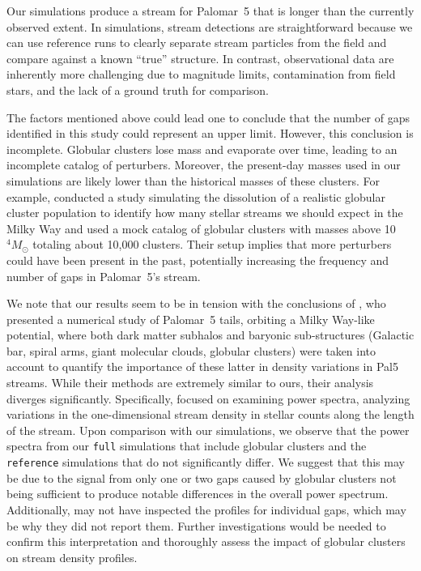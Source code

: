     Our simulations produce a stream for Palomar~5 that is longer than the currently observed extent. In simulations, stream detections are straightforward because we can use reference runs to clearly separate stream particles from the field and compare against a known ``true'' structure. In contrast, observational data are inherently more challenging due to magnitude limits, contamination from field stars, and the lack of a ground truth for comparison. 
  
    The factors mentioned above could lead one to conclude that the number of gaps identified in this study could represent an upper limit. However, this conclusion is incomplete. Globular clusters lose mass and evaporate over time, leading to an incomplete catalog of perturbers. Moreover, the present-day masses used in our simulations are likely lower than the historical masses of these clusters. For example, \citet{2024ApJ...976...54P} conducted a study simulating the dissolution of a realistic globular cluster population to identify how many stellar streams we should expect in the Milky Way and used a mock catalog of globular clusters with masses above 10$^4 M_\odot$ totaling about 10,000 clusters. Their setup implies that more perturbers could have been present in the past, potentially increasing the frequency and number of gaps in Palomar~5's stream.

    We note that our results seem to be in tension with the conclusions of \citet{2019MNRAS.484.2009B}, who presented a numerical study of Palomar~5 tails, orbiting a Milky Way-like potential, where both dark matter subhalos and baryonic sub-structures (Galactic bar, spiral arms, giant molecular clouds, globular clusters) were taken into account to quantify the importance of these latter in density variations in Pal5 streams. While their methods are extremely similar to ours, their analysis diverges significantly. Specifically, \citet{2019MNRAS.484.2009B} focused on examining power spectra, analyzing variations in the one-dimensional stream density in stellar counts along the length of the stream. Upon comparison with our simulations, we observe that the power spectra from our \texttt{full} simulations that include globular clusters and the \texttt{reference} simulations that do not significantly differ. We suggest that this may be due to the signal from only one or two gaps caused by globular clusters not being sufficient to produce notable differences in the overall power spectrum. Additionally, \citet{2019MNRAS.484.2009B} may not have inspected the profiles for individual gaps, which may be why they did not report them. Further investigations would be needed to confirm this interpretation and thoroughly assess the impact of globular clusters on stream density profiles. \\

